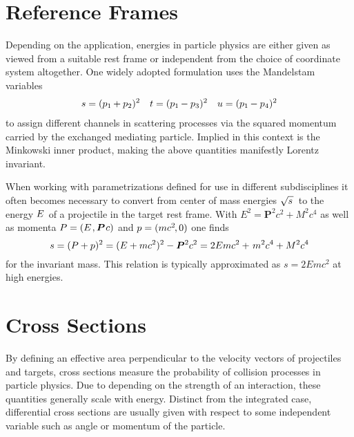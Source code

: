 \label{ch:appendix}



\section{Reference Frames}
\label{sec:frames}

Depending on the application, energies in particle physics are either given as viewed from a suitable rest frame or
independent from the choice of coordinate system altogether. One widely adopted formulation uses the Mandelstam variables
\begin{align*}
	s = (p_1 \kern-0.5pt + p_2)^2 &&
	t = (p_1 \kern-0.5pt - p_3)^2 &&
	u = (p_1 \kern-0.5pt - p_4)^2
\end{align*}
to assign different channels in scattering processes via the squared momentum carried by the exchanged mediating particle.
Implied in this context is the Minkowski inner product, making the above quantities manifestly Lorentz invariant.

When working with parametrizations defined for use in different subdisciplines it often becomes necessary to convert from
center of mass energies $\sqrt{s \kern+1.0pt} \kern+1.0pt$ to the energy $\kern-0.5pt E \kern+1.0pt$ of a projectile in the
target rest frame. With $E^2 = \bm{P}^2 c^2 + M^2 c^4$ as well as momenta $P = (E \kern+1.0pt , \bm{P} \kern+0.75pt c)$ and
$p = (m c^2 \kern-1.0pt , 0)$ one finds
\begin{equation*}
	s = (P + p)^2 = (E + m c^2)^2 - \bm{P}^2 c^2 = 2E m c^2 + \kern+1.0pt m^2 c^4 + M^2 c^4
\end{equation*}
for the invariant mass. This relation is typically approximated as $s = 2E m c^2$ at high energies.



\section{Cross Sections}
\label{sec:cross}

By defining an effective area perpendicular to the velocity vectors of projectiles and targets, cross sections measure
the probability of collision processes in particle physics. Due to depending on the strength of an interaction, these
quantities generally scale with energy. Distinct from the integrated case, differential cross sections are usually given
with respect to some independent variable such as angle or momentum of the particle.



